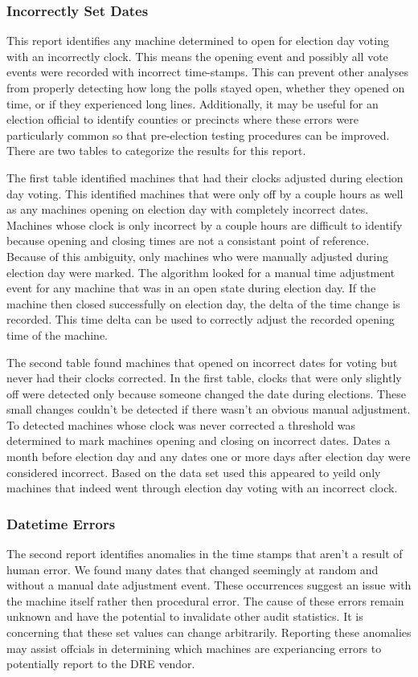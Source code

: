 \subsubsection{Incorrectly Set Dates}
This report identifies any machine determined to open for election day voting
with an incorrectly clock.  This means the opening event and possibly all vote
events were recorded with incorrect time-stamps. This can prevent other analyses
from properly detecting how long the polls stayed open, whether they opened on
time, or if they experienced long lines. Additionally, it may be useful for an
election official to identify counties or precincts where these errors were
particularly common so that pre-election testing procedures can be improved.
There are two tables to categorize the results for this report.

The first table identified machines that had their clocks adjusted during
election day voting. This identified machines that were only off by a couple hours
as well as any machines opening on election day with completely incorrect dates.
Machines whose clock is only incorrect by a couple hours are difficult to
identify because opening and closing times are not a consistant point of
reference. Because of this ambiguity, only machines who were manually adjusted
during election day were marked. The algorithm looked for a manual time
adjustment event for any machine that was in an open state during election day.
If the machine then closed successfully on election day, the delta of the time
change is recorded. This time delta can be used to correctly adjust the recorded
opening time of the machine.

The second table found machines that opened on incorrect dates for voting but
never had their clocks corrected. In the first table, clocks that were only
slightly off were detected only because someone changed the date during
elections.  These small changes couldn't be detected if there wasn't an obvious
manual adjustment. To detected machines whose clock was never corrected a
threshold was determined to mark machines opening and closing on incorrect
dates. Dates a month before election day and any dates one or more days after
election day were considered incorrect.  Based on the data set used this
appeared to yeild only machines that indeed went through election day voting
with an incorrect clock.

\subsubsection{Datetime Errors}
The second report identifies anomalies in the time stamps that aren't a result
of human error. We found many dates that changed seemingly at random and without
a manual date adjustment event. These occurrences suggest an issue with the
machine itself rather then procedural error. The cause of these errors remain
unknown and have the potential to invalidate other audit statistics. It is
concerning that these set values can change arbitrarily. Reporting these
anomalies may assist offcials in determining which machines are experiancing
errors to potentially report to the DRE vendor.

